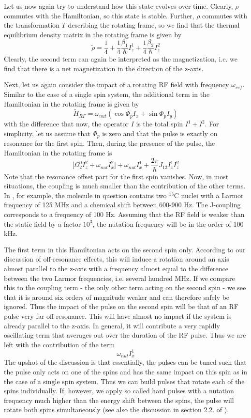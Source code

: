 \documentclass[a4paper, draft]{article}
\theoremstyle{own}
\theoremstyle{remark}
\begin{document}
Let us now again try to understand how this state evolves over time. Clearly, $\rho$ commutes with the Hamiltonian, so this state is stable. Further, $\rho$ commutes with the transformation $T$ describing the rotating frame, so we find that the thermal equilibrium density matrix in the rotating frame is given by
$$
\widetilde{\rho} = \frac{1}{4} + \frac{1}{4} \frac{\beta_1}{\hbar} I_z^1 + \frac{1}{4} \frac{\beta_2}{\hbar} I_z^2
$$
Clearly, the second term can again be interpreted as the magnetization, i.e. we find that there is a net magnetization in the direction of the z-axis.


Next, let us again consider the impact of a rotating RF field with frequency $\omega_{ref}$. Similar to the case of a single spin system, the additional term in the Hamiltonian in the rotating frame is given by
$$
\widetilde{H}_{RF} =  \omega_{nut} ( \cos \Phi_p I_x + \sin \Phi_p I_y)
$$
with the difference that now, the operator $I$ is the total spin $I^1 + I^2$. For simplicity, let us assume that $\Phi_p$ is zero and that the pulse is exactly on resonance for the first spin. Then, during the presence of the pulse, the Hamiltonian in the rotating frame is
$$
\big[  \Omega^0_2 I_z^2 + \omega_{nut} I_x^2 \big] + \omega_{nut} I_x^1  + \frac{2 \pi}{\hbar} J_{12} I_z^1 I_z^2 
$$
Note that the resonance offset part for the first spin vanishes. Now, in most situations, the coupling is much smaller than the contribution of the other terms. In \cite{NMRReview}, for example, the molecule in question contains two ${}^{13}$C nuclei with a Larmor frequency of 125 MHz and a chemical shift between 600-900 Hz. The J-coupling corresponds to a frequency of 100 Hz. Assuming that the RF field is weaker than the static field by a factor $10^3$, the nutation frequency will be in the order of 100 kHz. 

The first term in this Hamiltonian acts on the second spin only. According to our discussion of off-resonance effects, this will induce a rotation around an axis almost parallel to the z-axis with a frequency almost equal to the difference between the two Larmor frequencies, i.e. several hundred MHz. If we compare this to the coupling term - the only other term acting on the second spin - we see that it is around six orders of magnitude weaker and can therefore safely be ignored. Thus the impact of the pulse on the second spin will be that of an RF pulse very far off resonance. This will have almost no impact if the system is already parallel to the z-axis. In general, it will contribute a very rapidly oscillating term that averages out over the duration of the RF pulse. Thus we are left with the contribution of the term
$$
\omega_{nut} I_x^1
$$
The upshot of the discussion is that essentially, the pulses can be tuned such that the pulse only acts on one of the spins and has the same impact on this spin as in the case of a single spin system. Thus we can build pulses that rotate each of the spins individually. If, however, we apply so called hard pulses with a nutation frequency much higher than the energy shift between the spins, the pulse will rotate both spins simultaneously (see also the discussion in section 2.2. of \cite{NMRReview}).
\end{document}
